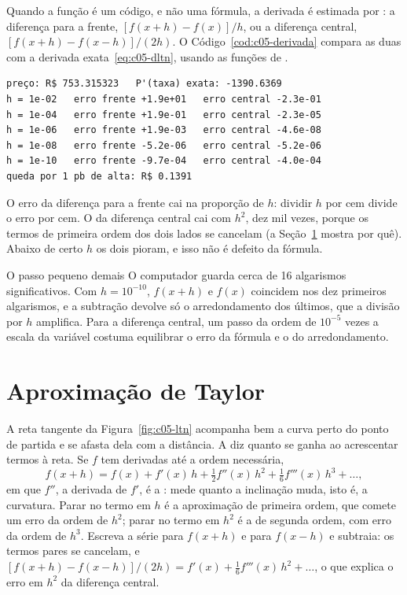 Quando a função é um código, e não uma fórmula, a derivada é estimada por : a diferença para a frente, $[f(x+h) - f(x)]/h$, ou a diferença central, $[f(x+h) - f(x-h)]/(2h)$. O Código~\ref{cod:c05-derivada} compara as duas com a derivada exata~\eqref{eq:c05-dltn}, usando as funções de .


\begin{lstlisting}[style=saida]
preço: R$ 753.315323   P'(taxa) exata: -1390.6369
h = 1e-02   erro frente +1.9e+01   erro central -2.3e-01
h = 1e-04   erro frente +1.9e-01   erro central -2.3e-05
h = 1e-06   erro frente +1.9e-03   erro central -4.6e-08
h = 1e-08   erro frente -5.2e-06   erro central -5.2e-06
h = 1e-10   erro frente -9.7e-04   erro central -4.0e-04
queda por 1 pb de alta: R$ 0.1391
\end{lstlisting}

O erro da diferença para a frente cai na proporção de $h$: dividir $h$ por cem divide o erro por cem. O da diferença central cai com $h^2$, dez mil vezes, porque os termos de primeira ordem dos dois lados se cancelam (a Seção~\ref{sec:c05-taylor} mostra por quê). Abaixo de certo $h$ os dois pioram, e isso não é defeito da fórmula.

\begin{armadilha}{O passo pequeno demais}
O computador guarda cerca de 16 algarismos significativos. Com $h = 10^{-10}$, $f(x+h)$ e $f(x)$ coincidem nos dez primeiros algarismos, e a subtração devolve só o arredondamento dos últimos, que a divisão por $h$ amplifica. Para a diferença central, um passo da ordem de $10^{-5}$ vezes a escala da variável costuma equilibrar o erro da fórmula e o do arredondamento.
\end{armadilha}

\section{Aproximação de Taylor}
\label{sec:c05-taylor}

A reta tangente da Figura~\ref{fig:c05-ltn} acompanha bem a curva perto do ponto de partida e se afasta dela com a distância. A  diz quanto se ganha ao acrescentar termos à reta. Se $f$ tem derivadas até a ordem necessária,
\begin{equation}
  f(x+h) = f(x) + f'(x)\,h + \tfrac12 f''(x)\,h^2 + \tfrac16 f'''(x)\,h^3 + \dots ,
  \label{eq:c05-taylor}
\end{equation}
em que $f''$, a derivada de $f'$, é a : mede quanto a inclinação muda, isto é, a curvatura. Parar no termo em $h$ é a aproximação de primeira ordem, que comete um erro da ordem de $h^2$; parar no termo em $h^2$ é a de segunda ordem, com erro da ordem de $h^3$. Escreva a série para $f(x+h)$ e para $f(x-h)$ e subtraia: os termos pares se cancelam, e $[f(x+h) - f(x-h)]/(2h) = f'(x) + \tfrac16 f'''(x)\,h^2 + \dots$, o que explica o erro em $h^2$ da diferença central.

